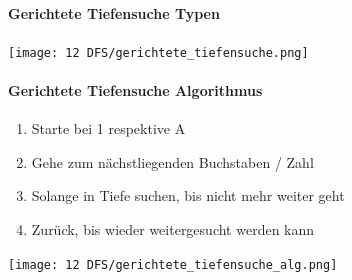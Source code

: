 \paragraph{Gerichtete Tiefensuche Typen}
\begin{center}
    \texttt{[image: 12 DFS/gerichtete\_tiefensuche.png]}
\end{center}


\paragraph{Gerichtete Tiefensuche Algorithmus}
\begin{enumerate}
    \item Starte bei 1 respektive A
    \item Gehe zum nächstliegenden Buchstaben / Zahl
    \item Solange in Tiefe suchen, bis nicht mehr weiter geht
    \item Zurück, bis wieder weitergesucht werden kann
\end{enumerate}
\begin{center}
    \texttt{[image: 12 DFS/gerichtete\_tiefensuche\_alg.png]}
\end{center}


\newpage